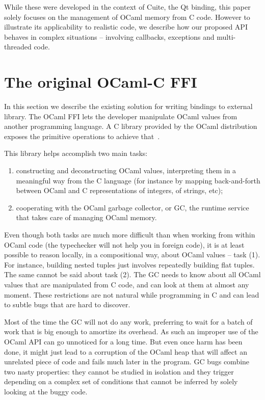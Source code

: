 \documentclass[a4paper]{easychair}
\begin{document}
While these were developed in the context of Cuite, the Qt binding, this
paper solely focuses on the management of OCaml memory from C code.
However to illustrate its applicability to realistic code, we describe
how our proposed API behaves in complex situations -- involving
callbacks, exceptions and multi-threaded code.

\section{The original OCaml-C FFI}

In this section we describe the existing solution for writing bindings to
external library.  The OCaml FFI lets the developer manipulate OCaml values
from another programming language. A C library provided by the OCaml
distribution exposes the primitive operations to achieve that~\citep{harmony}.

This library helps accomplish two main tasks:

\begin{enumerate}
\item constructing and deconstructing OCaml values, interpreting them in a
      meaningful way from the C language (for instance by mapping
      back-and-forth between OCaml and C representations of integers, of
      strings, etc);
\item cooperating with the OCaml garbage collector, or GC, the runtime
      service that takes care of managing OCaml memory.
\end{enumerate}

Even though both tasks are much more difficult than when working from
within OCaml code (the typechecker will not help you in foreign code),
it is at least possible to reason locally, in a compositional way, about
OCaml values -- task (1). For instance, building nested tuples just
involves repeatedly building flat tuples.
The same cannot be said about task (2). The GC needs to know about all
OCaml values that are manipulated from C code, and can look at them at
almost any moment. These restrictions are not natural while programming
in C and can lead to subtle bugs that are hard to discover.

Most of the time the GC will not do any work, preferring to wait for a
batch of work that is big enough to amortize its overhead. As such an
improper use of the OCaml API can go unnoticed for a long time. But even
once harm has been done, it might just lead to a corruption of the OCaml
heap that will affect an unrelated piece of code and fails much later in the
program.  GC bugs combine two nasty properties: they cannot be studied in
isolation and they trigger depending on a complex set of conditions that
cannot be inferred by solely looking at the buggy code.
\end{document}
